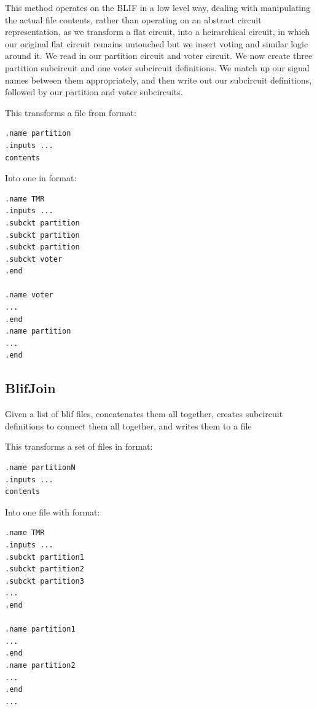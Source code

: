 \documentclass[12pt,final,oneside]{article} %
\begin{document}
This method operates on the \ac{BLIF} in a low level way, dealing with manipulating the actual file contents, rather than operating on an abstract circuit representation, as we transform a flat circuit, into a heirarchical circuit, in which our original flat circuit remains untouched but we insert voting and similar logic around it.
We read in our partition circuit and voter circuit. We now create three partition subcircuit and one voter subcircuit definitions. We match up our signal names between them appropriately, and then write out our subcircuit definitions, followed by our partition and voter subcircuits.

This transforms a file from format:
\begin{lstlisting}
.name partition
.inputs ...
contents
\end{lstlisting}
Into one in format:
\begin{lstlisting}
.name TMR
.inputs ...
.subckt partition
.subckt partition
.subckt partition
.subckt voter
.end

.name voter
...
.end
.name partition
...
.end
\end{lstlisting}

\newpage
\subsection{BlifJoin}
Given a list of blif files, concatenates them all together, creates
subcircuit definitions to connect them all together, and writes them to a file

This transforms a set of files in format:
\begin{lstlisting}
.name partitionN
.inputs ...
contents
\end{lstlisting}
Into one file with format:
\begin{lstlisting}
.name TMR
.inputs ...
.subckt partition1
.subckt partition2
.subckt partition3
...
.end

.name partition1
...
.end
.name partition2
...
.end
...
\end{lstlisting}
\newpage
\end{document}
